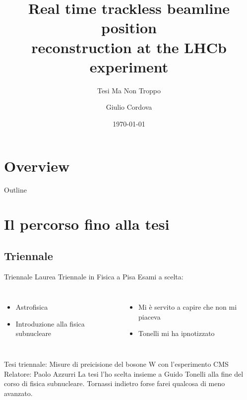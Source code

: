 \documentclass[
10pt,
aspectratio=169,
]{beamer}
\title{Real time trackless beamline position\\ reconstruction at the LHCb experiment }
\subtitle{Tesi Ma Non Troppo}
\author[G.C.]{Giulio Cordova}
\institute[Università di Pisa]{Dipartimento di Fisica E. Fermi\\
Università di Pisa}
\date{\today}
\begin{document}
\maketitle









\section*{Overview}
\begin{frame}{Outline}
    \tableofcontents[]{}
\end{frame}
\section{Il percorso fino alla tesi}
\subsection{Triennale}
\begin{frame}{Triennale}
Laurea Triennale in Fisica a Pisa 
\vfill
Esami a scelta:
\begin{columns}
\begin{itemize}
    \item Astrofisica 
    \item Introduzione alla fisica subnucleare
\end{itemize}
\begin{itemize}
    \item Mi è servito a capire che non mi piaceva
    \item Tonelli mi ha ipnotizzato
\end{itemize}
    \end{columns}
    \vfill
    Tesi triennale: Misure di preicisione del bosone W con l'esperimento CMS\\
    Relatore: Paolo Azzurri
    \vfill
    La tesi l'ho scelta insieme a Guido Tonelli alla fine del corso di fisica subnucleare. Tornassi indietro forse farei qualcosa di meno avanzato.
\end{frame}
\end{document}
